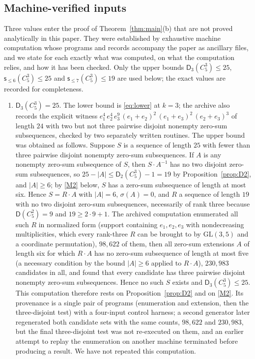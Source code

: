 \documentclass[11pt]{article}
\theoremstyle{definition}
\theoremstyle{remark}
\newcommand{\Dk}{\mathsf{D}}
\newcommand{\C}{C_5^{3}}
\newcommand{\sle}[1]{\mathsf{s}_{\le #1}}
\begin{document}
\subsection{Machine-verified inputs}\label{subsec:machine}

Three values enter the proof of Theorem~\ref{thm:main}(b) that are not proved analytically in this paper. They were established by exhaustive machine computation whose programs and records accompany the paper as ancillary files, and we state for each exactly what was computed, on what the computation relies, and how it has been checked. Only the upper bounds $\Dk_3(\C)\le25$, $\sle{6}(\C)\le25$ and $\sle{7}(\C)\le19$ are used below; the exact values are recorded for completeness.

\begin{enumerate}[label=\textup{(M\arabic*)},leftmargin=3em]
\item\label{M1} $\Dk_3(\C)=25$. The lower bound is \eqref{eq:lower} at $k=3$; the archive also records the explicit witness $e_1^4\,e_2^4\,e_3^9\,(e_1+e_2)^2\,(e_1+e_3)^2\,(e_2+e_3)^3$ of length $24$ with two but not three pairwise disjoint nonempty zero-sum subsequences, checked by two separately written routines. The upper bound was obtained as follows. Suppose $S$ is a sequence of length $25$ with fewer than three pairwise disjoint nonempty zero-sum subsequences. If $A$ is any nonempty zero-sum subsequence of $S$, then $S\cdot A^{-1}$ has no two disjoint zero-sum subsequences, so $25-|A|\le\Dk_2(\C)-1=19$ by Proposition~\ref{prop:D2}, and $|A|\ge6$; by \ref{M2} below, $S$ has a zero-sum subsequence of length at most six. Hence $S=R\cdot A$ with $|A|=6$, $\sigma(A)=0$, and $R$ a sequence of length $19$ with no two disjoint zero-sum subsequences, necessarily of rank three because $\Dk(C_5^2)=9$ and $19\ge2\cdot9+1$. The archived computation enumerated all such $R$ in normalized form (support containing $e_1,e_2,e_3$ with nondecreasing multiplicities, which every rank-three $R$ can be brought to by $\mathrm{GL}(3,5)$ and a coordinate permutation), $98{,}622$ of them, then all zero-sum extensions $A$ of length six for which $R\cdot A$ has no zero-sum subsequence of length at most five (a necessary condition by the bound $|A|\ge6$ applied to $R\cdot A$), $230{,}983$ candidates in all, and found that every candidate has three pairwise disjoint nonempty zero-sum subsequences. Hence no such $S$ exists and $\Dk_3(\C)\le25$. This computation therefore rests on Proposition~\ref{prop:D2} and on \ref{M2}. Its provenance is a single pair of programs (enumeration and extension, then the three-disjoint test) with a four-input control harness; a second generator later regenerated both candidate sets with the same counts, $98{,}622$ and $230{,}983$, but the final three-disjoint test was not re-executed on them, and an earlier attempt to replay the enumeration on another machine terminated before producing a result. We have not repeated this computation.

\end{enumerate}
\end{document}
